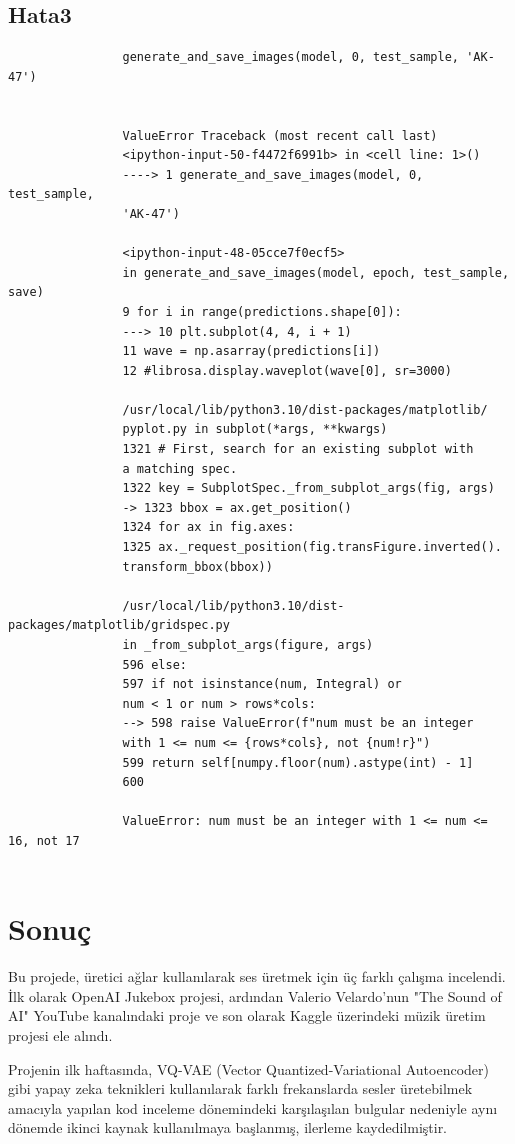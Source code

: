 \documentclass[12pt, a4paper]{article}
\begin{document}
			\subsection{Hata3}
			\begin{verbatim}
				generate_and_save_images(model, 0, test_sample, 'AK-47')
				
				
				ValueError Traceback (most recent call last)
				<ipython-input-50-f4472f6991b> in <cell line: 1>()
				----> 1 generate_and_save_images(model, 0, test_sample,
				'AK-47')
				
				<ipython-input-48-05cce7f0ecf5> 
				in generate_and_save_images(model, epoch, test_sample, save)
				9 for i in range(predictions.shape[0]):
				---> 10 plt.subplot(4, 4, i + 1)
				11 wave = np.asarray(predictions[i])
				12 #librosa.display.waveplot(wave[0], sr=3000)
				
				/usr/local/lib/python3.10/dist-packages/matplotlib/
				pyplot.py in subplot(*args, **kwargs)
				1321 # First, search for an existing subplot with 
				a matching spec.
				1322 key = SubplotSpec._from_subplot_args(fig, args)
				-> 1323 bbox = ax.get_position()
				1324 for ax in fig.axes:
				1325 ax._request_position(fig.transFigure.inverted().
				transform_bbox(bbox))
				
				/usr/local/lib/python3.10/dist-packages/matplotlib/gridspec.py 
				in _from_subplot_args(figure, args)
				596 else:
				597 if not isinstance(num, Integral) or
				num < 1 or num > rows*cols:
				--> 598 raise ValueError(f"num must be an integer
				with 1 <= num <= {rows*cols}, not {num!r}")
				599 return self[numpy.floor(num).astype(int) - 1]
				600
				
				ValueError: num must be an integer with 1 <= num <= 16, not 17
				
			\end{verbatim}
		\section{Sonuç}
		Bu projede, üretici ağlar kullanılarak ses üretmek için üç farklı çalışma incelendi. İlk olarak OpenAI Jukebox projesi, ardından Valerio Velardo'nun "The Sound of AI" YouTube kanalındaki proje ve son olarak Kaggle üzerindeki müzik üretim projesi ele alındı.
		
		Projenin ilk haftasında, VQ-VAE (Vector Quantized-Variational Autoencoder) gibi yapay zeka teknikleri kullanılarak farklı frekanslarda sesler üretebilmek amacıyla yapılan kod inceleme dönemindeki karşılaşılan bulgular nedeniyle aynı dönemde ikinci kaynak kullanılmaya başlanmış, ilerleme kaydedilmiştir.
		
\end{document}

